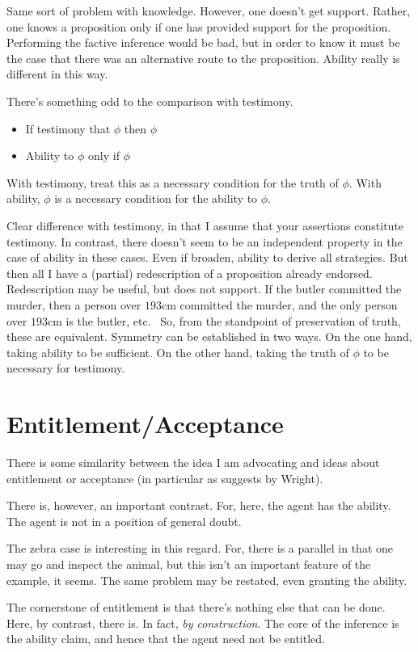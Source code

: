 \documentclass[10pt]{article}
\begin{document}
\begin{note}
  Same sort of problem with knowledge.
  However, one doesn't get support.
  Rather, one knows a proposition only if one has provided support for the proposition.
  Performing the factive inference would be bad, but in order to know it must be the case that there was an alternative route to the proposition.
  Ability really is different in this way.
\end{note}


\begin{note}
  There's something odd to the comparison with testimony.
  \begin{itemize}
  \item If testimony that \(\phi\) then \(\phi\)
  \item Ability to \(\phi\) only if \(\phi\)
  \end{itemize}
  With testimony, treat this as a necessary condition for the truth of \(\phi\).
  With ability, \(\phi\) is a necessary condition for the ability to \(\phi\).

  {
    \color{green}
    Clear difference with testimony, in that I assume that your assertions constitute testimony.
    In contrast, there doesn't seem to be an independent property in the case of ability in these cases.
    Even if broaden, ability to derive all strategies.
    But then all I have a (partial) redescription of a proposition already endorsed.
    Redescription may be useful, but does not support.
    If the butler committed the murder, then a person over \(193\)cm committed the murder, and the only person over \(193\)cm is the butler, etc.\
  }
  So, from the standpoint of preservation of truth, these are equivalent.
  Symmetry can be established in two ways.
  On the one hand, taking ability to be sufficient.
  On the other hand, taking the truth of \(\phi\) to be necessary for testimony.
\end{note}

\newpage

\section{Entitlement/Acceptance}
\label{sec:entitl}

\begin{note}[Idea]
  There is some similarity between the idea I am advocating and ideas about entitlement or acceptance (in particular as suggests by Wright).

  There is, however, an important contrast.
  For, here, the agent has the ability.
  The agent is not in a position of general doubt.

  The zebra case is interesting in this regard.
  For, there is a parallel in that one may go and inspect the animal, but this isn't an important feature of the example, it seems.
  The same problem may be restated, even granting the ability.

  The cornerstone of entitlement is that there's nothing else that can be done.
  Here, by contrast, there is.
  In fact, \emph{by construction}.
  The core of the inference is the ability claim, and hence that the agent need not be entitled.
\end{note}
\end{document}
